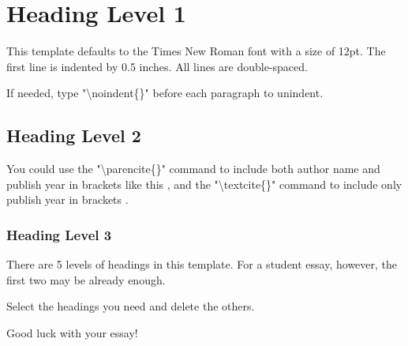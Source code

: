 \section{Heading Level 1}

This template defaults to the Times New Roman font with a size of 12pt. The first line is indented by 0.5 inches. All lines are double-spaced. 

\noindent If needed, type "\textbackslash noindent\{\}" before each paragraph to unindent.

\subsection{Heading Level 2}

You could use the "\textbackslash parencite\{\}" command to include both author name and publish year in brackets like this \parencite{lshort}, and the "\textbackslash textcite\{\}" command to include only publish year in brackets \textcite{lshort}.

\subsubsection{Heading Level 3}

There are 5 levels of headings in this template. For a student essay, however, the first two may be already enough.

 Select the headings you need and delete the others.

 Good luck with your essay!
